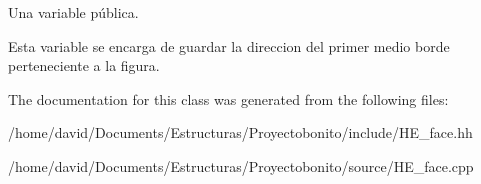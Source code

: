 Una variable pública. 

Esta variable se encarga de guardar la direccion del primer medio borde perteneciente a la figura. 

The documentation for this class was generated from the following files\-:\begin{DoxyCompactItemize}
\item 
/home/david/\-Documents/\-Estructuras/\-Proyectobonito/include/H\-E\-\_\-face.\-hh\item 
/home/david/\-Documents/\-Estructuras/\-Proyectobonito/source/H\-E\-\_\-face.\-cpp\end{DoxyCompactItemize}

